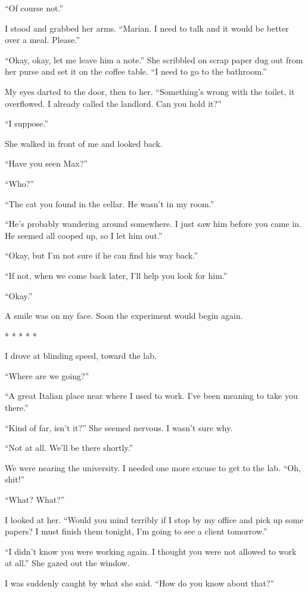 ``Of course not.''

I stood and grabbed her arms. ``Marian. I need to talk and it would be
better over a meal. Please.''

``Okay, okay, let me leave him a note.'' She scribbled on scrap paper
dug out from her purse and set it on the coffee table. ``I need to go to
the bathroom.''

My eyes darted to the door, then to her. ``Something's wrong with the
toilet, it overflowed. I already called the landlord. Can you hold it?''

``I suppose.''

She walked in front of me and looked back.

``Have you seen Max?''

``Who?''

``The cat you found in the cellar. He wasn't in my room.''

``He's probably wandering around somewhere. I just saw him before you
came in. He seemed all cooped up, so I let him out.''

``Okay, but I'm not sure if he can find his way back.''

``If not, when we come back later, I'll help you look for him.''

``Okay.''

A smile was on my face. Soon the experiment would begin again.

* * * * *

I drove at blinding speed, toward the lab.

``Where are we going?''

``A great Italian place near where I used to work. I've been meaning to
take you there.''

``Kind of far, isn't it?'' She seemed nervous. I wasn't sure why.

``Not at all. We'll be there shortly.''

We were nearing the university. I needed one more excuse to get to the
lab. ``Oh, shit!''

``What? What?''

I looked at her. ``Would you mind terribly if I stop by my office and
pick up some papers? I must finish them tonight, I'm going to see a
client tomorrow.''

``I didn't know you were working again. I thought you were not allowed
to work at all.'' She gazed out the window.

I was suddenly caught by what she said. ``How do you know about that?''

